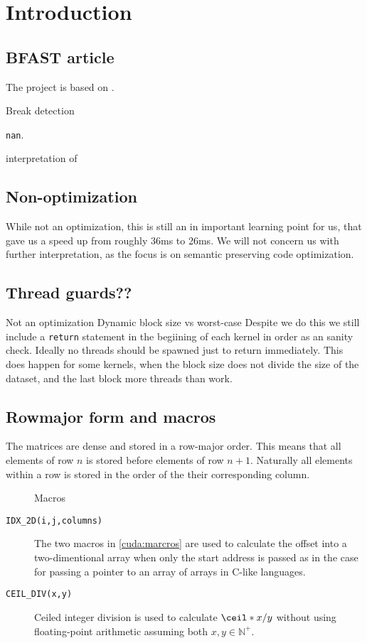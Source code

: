 \section{Introduction}

\subsection{\textsc{BFAST} article}
The project is based on \cite{bfast}.

Break detection

\texttt{nan}.

interpretation of


\subsection{Non-optimization}
While not an optimization, this is still an in important learning point for us,
that gave us a speed up from roughly 36ms to 26ms.
We will not concern us with further interpretation, as the focus is on
semantic preserving code optimization.


\subsection{Thread guards??}
Not an optimization Dynamic block size vs worst-case
Despite we do this we still include a \texttt{return} statement in the begiining
of each kernel in order as an sanity check. Ideally no threads should be spawned
just to return immediately. This does happen for some kernels, when the block
size does not divide the size of the dataset, and the last block more threads
than work.

\subsection{Rowmajor form and macros}

The matrices are dense and stored in a row-major order. This means that all elements
of row \(n\) is stored before elements of row \(n+1\). Naturally all elements
within a row is stored in the order of the their corresponding column.


\begin{figure}[H]
    \centering
    \caption{Macros}
    \label{cuda:macros}
\end{figure}


\begin{description}
    \item[\texttt{IDX\_2D(i,j,columns)}] The two macros in \autoref{cuda:marcros} are used to
calculate the offset into a two-dimentional array when only the start address is
passed as in the case for passing a pointer to an array of arrays in C-like languages.

\item[\texttt{CEIL\_DIV(x,y)}] Ceiled integer division is used to calculate
\(\ceil*{x/y}\) without using floating-point arithmetic assuming both \(x, y \in
\mathbb{N}^{+} \).

\end{description}

